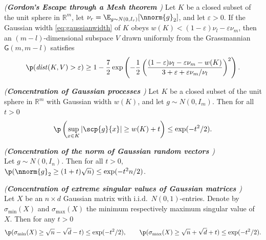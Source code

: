 \documentclass[11pt]{article}
\def\R{\mathbb{R}}
\def\epss{\varepsilon}
\begin{document}
\begin{lemma}\label{lem:escape}\emph{(\textbf{Gordon's Escape through a Mesh theorem \cite{Gordon1988}})}
 Let $K$  be a closed subset of the unit sphere in $\R^m$, let $\nu_r = \E_{g \sim N(0, I_r)}[\nnorm{g}_2]$, and let 
  $\epss > 0$. If the Gaussian width \eqref{eq:gaussianwidth} of $K$ obeys $w(K) < (1 - \epss) \nu_l - \epss \nu_m$, then an $(m - l)$-dimensional subspace
  $V$ drawn uniformly from the Grassmannian $\textsf{G}(m, m-l)$ satisfies
  \begin{equation*}
\p(\text{\emph{dist}}(K, V) > \epss) \geq 1 - \frac{7}{2} \exp \left(-\frac{1}{2} \left( \frac{(1 - \epss)\nu_l - \epss \nu_m  - w(K)}{3 + \epss + \epss \nu_m / \nu_l} \right)^2 \right).
\end{equation*}
\end{lemma}

\begin{lemma}\label{lem:concentration_width}\emph{(\textbf{Concentration of Gaussian processes \cite{Boucheron2013}})}
Let $K$ be a closed subset of the unit sphere in $\R^m$ with Gaussian width $w(K)$, and let $g \sim N(0, I_m)$. Then for all $t > 0$
 \begin{equation*}
 \p \left(\sup_{x \in K} |\scp{g}{x}| \geq w(K) + t \right) \leq \exp(-t^2/2). 
\end{equation*}
\end{lemma}

\begin{lemma}\label{lem:normconcentration} \emph{(\textbf{Concentration of the norm of Gaussian random vectors \cite{Vershynin2010}})}\\ 
Let $g \sim N(0, I_n)$. Then for all $t > 0$, $\p(\nnorm{g}_2 \geq (1 + t) \sqrt{n}) \leq \exp(-t^2 n / 2)$.  
\end{lemma}

\begin{lemma}\label{lem:extremesingularvalues}\hspace*{-.7ex}\emph{(\textbf{Concentration of extreme singular values of Gaussian matrices \cite{Vershynin2010}})}\\
  Let $X$ be an $n \times d$ Gaussian matrix with i.i.d.~$N(0,1)$-entries. Denote by $\sigma_{\min}(X)$
  and $\sigma_{\max}(X)$ the minimum respectively maximum singular value of $X$. Then for any $t > 0$
\begin{equation*}
\p(\sigma_{\min}(X) \geq \sqrt{n} - \sqrt{d} - t) \leq \exp(-t^2 / 2), \qquad \p(\sigma_{\max}(X) \geq \sqrt{n} + \sqrt{d} + t) \leq \exp(-t^2 / 2).  
\end{equation*}
\end{lemma}
\end{document}
